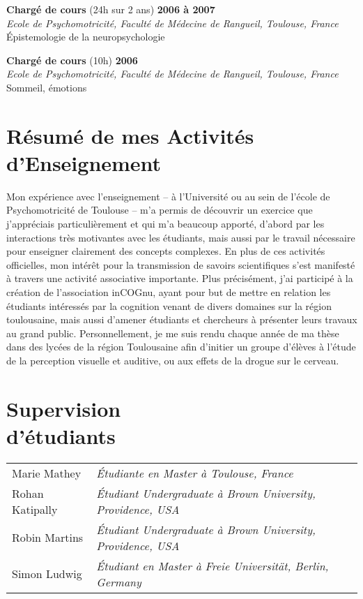 \documentclass[margin,line]{resume}
\begin{document}
\begin{resume}
	\textbf{Chargé de cours} (24h sur 2 ans) \hfill \textbf{2006 à 2007}\\
	\textsl{Ecole de Psychomotricité, Faculté de Médecine de Rangueil, Toulouse, France}\\
	\'Epistemologie de la neuropsychologie

	\textbf{Chargé de cours} (10h) \hfill \textbf{2006}\\
	\textsl{Ecole de Psychomotricité, Faculté de Médecine de Rangueil, Toulouse, France}\\
	Sommeil, émotions


\vspace{3mm}
\section{\mysidestyle Résumé de mes Activités \\d'Enseignement}
Mon expérience avec l'enseignement -- à l'Université ou au sein de l'école de Psychomotricité de Toulouse -- m'a permis de découvrir un exercice que j'appréciais particulièrement et qui m’a beaucoup apporté, d’abord par les interactions très motivantes avec les étudiants, mais aussi par le travail nécessaire pour enseigner clairement des concepts complexes. En plus de ces activités officielles, mon intérêt pour la transmission de savoirs scientifiques s’est manifesté à travers une activité associative importante. Plus précisément, j’ai participé à la création de l’association inCOGnu, ayant pour but de mettre en relation les étudiants intéressés par la cognition venant de divers domaines sur la région toulousaine, mais aussi d’amener étudiants et chercheurs à présenter leurs travaux au grand public. Personnellement, je me suis rendu chaque année de ma thèse dans des lycées de la région Toulousaine afin d’initier un groupe d’élèves à l’étude de la perception visuelle et auditive, ou aux effets de la drogue sur le cerveau.

\vspace{3mm}
\section{\mysidestyle Supervision\\d'étudiants}
	
	\begin{tabular}{@{}ll} %
	Marie Mathey    & \textsl{\'Etudiante en Master à Toulouse, France}                         \\
	Rohan Katipally & \textsl{\'Etudiant Undergraduate à Brown University, Providence, USA} \\
	Robin Martins   & \textsl{\'Etudiant Undergraduate à Brown University, Providence, USA} \\
	Simon Ludwig    & \textsl{\'Etudiant en Master à Freie Universität, Berlin, Germany}
	\end{tabular}
	


\end{resume}
\end{document}

